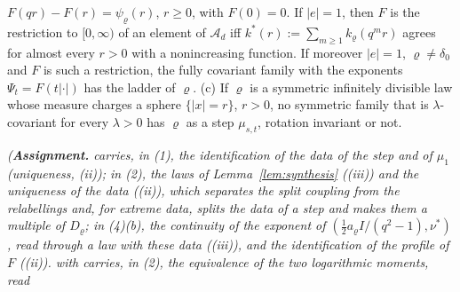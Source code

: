\begin{proposition}
\begin{enumerate}
$F(qr) - F(r) = \psi_\varrho(r)$, $r \ge 0$, with $F(0) = 0$. If $|e| = 1$, then $F$ is the restriction to $[0,\infty)$ of an element of $\mathcal{A}_d$ iff $k^*(r) := \sum_{m \ge 1}k_\varrho(q^mr)$ agrees for almost every $r > 0$
with a nonincreasing function. If moreover $|e| = 1$, $\varrho \ne \delta_0$ and $F$ is such a restriction, the
fully covariant family with the exponents $\Psi_t = F(t|\cdot|)$ has the ladder of $\varrho$.
(c) If $\varrho$ is a symmetric infinitely divisible law whose \Levy{} measure charges a sphere
$\{|x| = r\}$, $r > 0$, no symmetric family that is $\lambda$-covariant for every $\lambda > 0$ has
$\varrho$ as a step $\mu_{s,t}$, rotation invariant or not.
\end{enumerate}
\statusA\quad{}\quad{}\quad{}\quad{}\quad{}\quad\emph{(\textbf{Assignment.}
 carries, in (1), the identification of the data of the step and of $\mu_1$ (uniqueness,
(ii)); in (2), the laws of Lemma~\ref{lem:synthesis} ((iii)) and the uniqueness of the data
((ii)), which separates the split coupling from the relabellings and, for extreme data, splits the
data of a step and makes them a multiple of $D_\varrho$; in (4)(b), the continuity of the
exponent of $(\tfrac12a_\varrho I/(q^2 - 1), \nu^*)$, read through a law with these data ((iii)),
and the identification of the profile of $F$ ((ii)).
 with  carries, in (2), the equivalence of the two logarithmic moments, read
}
\end{proposition}
